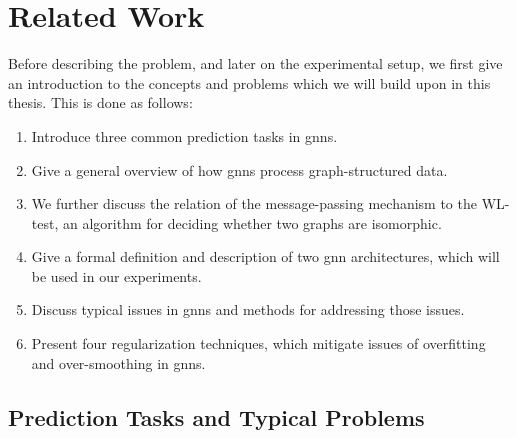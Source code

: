 %
\chapter{Related Work}
\label{sec:related}

Before describing the problem, and later on the experimental setup, we first give an introduction to the concepts and problems which we will build upon in this thesis.
This is done as follows:
\begin{enumerate}
    \item Introduce three common prediction tasks in \acp{gnn}.
    \item Give a general overview of how \acp{gnn} process graph-structured data.
    \item We further discuss the relation of the message-passing mechanism to the WL-test, an algorithm for deciding whether two graphs are isomorphic.
    \item Give a formal definition and description of two \ac{gnn}
          architectures, which will be used in our experiments.
    \item Discuss typical issues in \acp{gnn} and methods for addressing those issues.
    \item Present four regularization techniques, which mitigate issues of overfitting and over-smoothing in \acp{gnn}.
\end{enumerate}

\section{Prediction Tasks and Typical Problems}
\label{sec:related:pred}

